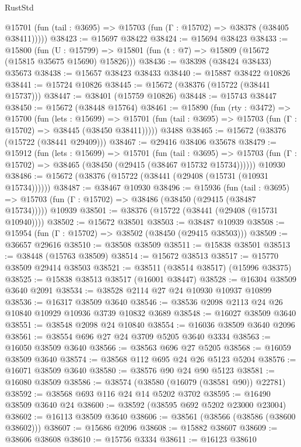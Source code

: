 \begin{lexlean}{RustStd}
\begin{coremodule}
      @15701 (fun (tail : @3695) => @15703 (fun (Γ : @15702) => @38378 (@38405 @38411)))))
@38423 := @15697 @38422
@38424 := @15694 @38423
@38433 := @15800
    (fun (U : @15799) => @15801 (fun (t : @7) => @15809 (@15672 (@15815 @35675 @15690) @15826)))
@38436 := @38398 (@38424 @38433) @35673
@38438 := @15657 @38423 @38433
@38440 := @15887 @38422 @10826
@38441 := @15724 @10826
@38445 := @15672 (@38376 (@15722 (@38441 @15737)))
@38447 := @38401 (@15759 @10826)
@38448 := @15743 @38447
@38450 := @15672 (@38448 @15764)
@38461 := @15890
    (fun (rty : @3472) =>
    @15700
      (fun (lets : @15699) =>
      @15701 (fun (tail : @3695) => @15703 (fun (Γ : @15702) => @38445 (@38450 @38411)))))
    @3488
@38465 := @15672 (@38376 (@15722 (@38441 @29409)))
@38467 := @29416 @38406 @35678
@38479 := @15912
    (fun (lets : @15699) =>
    @15701
      (fun (tail : @3695) =>
      @15703 (fun (Γ : @15702) => @38465 (@38450 (@29415 (@38467 @15732 @15734))))))
    @10930
@38486 := @15672 (@38376 (@15722 (@38441 (@29408 (@15731 (@10931 @15734))))))
@38487 := @38467 @10930
@38496 := @15936
    (fun (tail : @3695) => @15703 (fun (Γ : @15702) => @38486 (@38450 (@29415 (@38487 @15734)))))
    @10939
@38501 := @38376 (@15722 (@38441 (@29408 (@15731 @10940))))
@38502 := @15672 @38501
@38503 := @38487 @10939
@38508 := @15954 (fun (Γ : @15702) => @38502 (@38450 (@29415 @38503)))
@38509 := @36657 @29616
@38510 := @38508 @38509
@38511 := @15838 @38501
@38513 := @38448 (@15763 @38509)
@38514 := @15672 @38513
@38517 := @15770 @38509 @29414 @38503
@38521 := @38511 (@38514 @38517) (@15996 @38375)
@38525 := @15838 @38513 @38517 (@16001 @38447)
@38528 := @16304 @38509 @3640 @2091
@38534 := @38528 @2114 @27 @24 @10930 @10937 @10899
@38536 := @16317 @38509 @3640
@38546 := @38536 @2098 @2113 @24 @26 @10840 @10929 @10936 @3739 @10832 @3689
@38548 := @16027 @38509 @3640
@38551 := @38548 @2098 @24 @10840
@38554 := @16036 @38509 @3640 @2096
@38561 := @38554 @696 @27 @24 @3709 @5205 @3640 @3334
@38563 := @16050 @38509 @3640
@38566 := @38563 @696 @27 @5205
@38568 := @16059 @38509 @3640
@38574 := @38568 @112 @695 @24 @26 @5123 @5204
@38576 := @16071 @38509 @3640
@38580 := @38576 @90 @24 @90 @5123
@38581 := @16080 @38509
@38586 := @38574 (@38580 (@16079 (@38581 @90)) @22781)
@38592 := @38568 @693 @116 @24 @14 @5202 @3702
@38595 := @16490 @38509 @3640 @24
@38600 := @38592 (@38595 @692 @5202 @23000 @23004)
@38602 := @16113 @38509 @3640
@38606 := @38561 (@38566 (@38586 (@38600 @38602)))
@38607 := @15686 @2096
@38608 := @15882 @38607
@38609 := @38606 @38608
@38610 := @15756 @3334
@38611 := @16123 @38610

\end{coremodule}
\end{lexlean}
